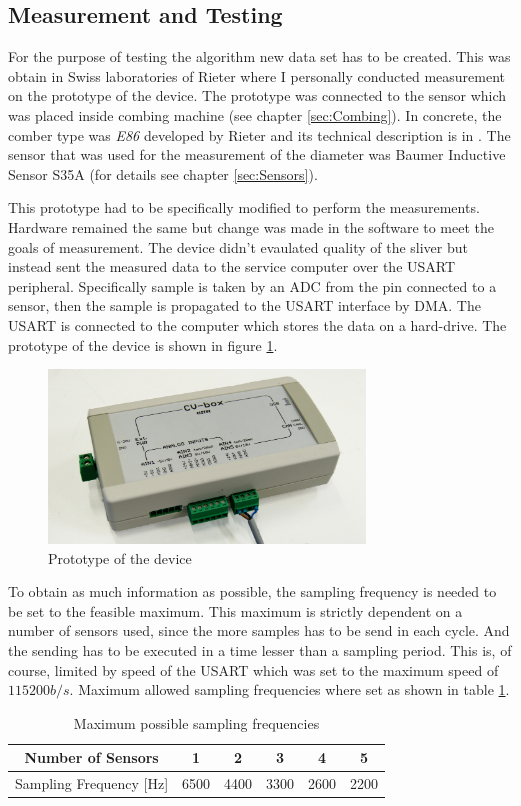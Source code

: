 \documentclass[twoside]{ctuthesis}
\theoremstyle{plain}
\theoremstyle{definition}
\theoremstyle{note}
\begin{document}
\subsection{Measurement and Testing}
\label{sec:MeasurmentAndTesting}
For the purpose of testing the algorithm new data set has to be created. This was obtain in Swiss laboratories of Rieter where I personally conducted measurement on the prototype of the device. The prototype was connected to the sensor which was placed inside combing machine (see chapter \ref{sec:Combing}). In concrete, the comber type was \textit{E86} developed by Rieter and its technical description is in \cite{cite:ComberE86}. The sensor that was used for the measurement of the diameter was Baumer Inductive Sensor S35A (for details see chapter \ref{sec:Sensors}).

This prototype had to be specifically modified to perform the measurements. Hardware remained the same but change was made in the software to meet the goals of measurement. The device didn't evaulated quality of the sliver but instead sent the measured data to the service computer over the USART peripheral. Specifically sample is taken by an ADC from the pin connected to a sensor, then the sample is propagated to the USART interface by DMA. The USART is connected to the computer which stores the data on a hard-drive. The prototype of the device is shown in figure \ref{fig:cvBox_covered}.
\begin{figure}[h]
	\centering
	\includegraphics[width=0.75\textwidth]{cvBox_covered.jpg}
	\caption{Prototype of the device}
	\label{fig:cvBox_covered}
\end{figure}

To obtain as much information as possible, the sampling frequency is needed to be set to the feasible maximum. This maximum is strictly dependent on a number of sensors used, since the more samples has to be send in each cycle. And the sending has to be executed in a time lesser than a sampling period. This is, of course, limited by speed of the USART which was set to the maximum speed of $115200 b/s$. Maximum allowed sampling frequencies where set as shown in table \ref{tab:possibleFs}.
\begin{table}[htbp]
	\centering
	\caption{Maximum possible sampling frequencies}
	\begin{tabular}{cccccc}
		\toprule
		Number of Sensors	 & 1 & 2 & 3 & 4 & 5 \\
		\midrule
		Sampling Frequency [Hz]  & 6500  & 4400   & 3300 & 2600   & 2200  \\
		
		\bottomrule
	\end{tabular}%
	\label{tab:possibleFs}%
\end{table}%
\end{document}
